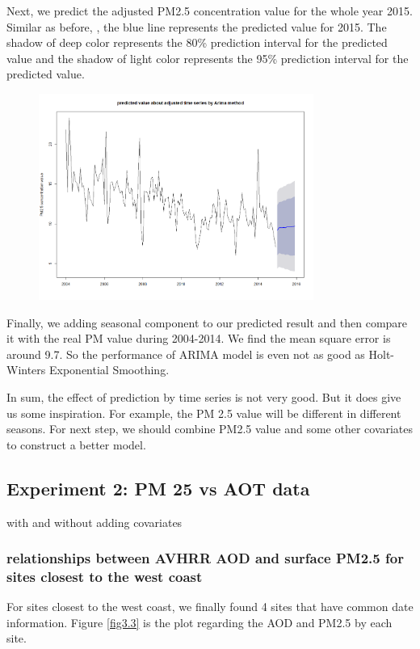 \documentclass[10pt]{article}
\begin{document}
Next, we predict the adjusted PM2.5 concentration value for the whole year 2015. Similar as before, , the blue line represents the predicted value for 2015. The shadow of deep color represents the 80\% prediction interval for the predicted value and the shadow of light color represents the 95\% prediction interval for the predicted value.

\begin{figure}[ht!]
\centering
\includegraphics[width = 90mm]{ts6.png}
\end{figure}

Finally, we adding seasonal component to our predicted result and then compare it with the real PM value during 2004-2014. We find the mean square error is around 9.7. So the performance of ARIMA model is even not as good as Holt-Winters Exponential Smoothing.

In sum, the effect of prediction by time series is not very good. But it does give us some inspiration. For example, the PM 2.5 value will be different in different seasons. For next step, we should combine PM2.5 value and some other covariates to construct a better model.



\subsection{Experiment 2: PM 25 vs AOT data}
with and without adding covariates


\subsubsection{relationships between AVHRR AOD and surface PM2.5 for sites closest to the west coast}

For sites closest to the west coast, we finally found 4 sites that have common date information. Figure \ref{fig3.3} is the plot regarding the AOD and PM2.5 by each site. 
\end{document}
